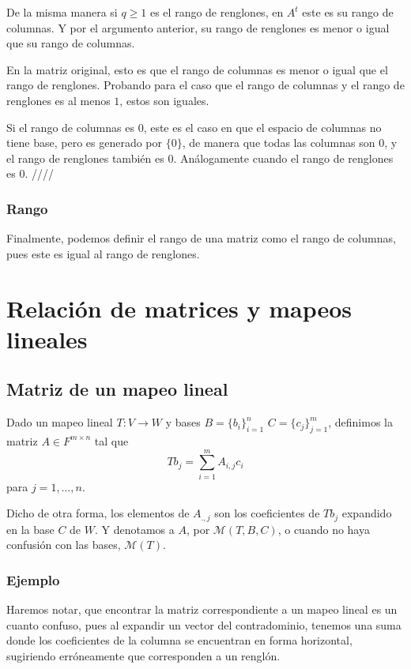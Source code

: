 \documentclass{article}
\begin{document}
De la misma manera si $q\geq 1$ es el rango de renglones, en $A^t$
este es su rango de columnas. Y por el argumento anterior, su
rango de renglones es menor o igual que su rango de columnas.

En la matriz original, esto es que el rango de columnas es menor
o igual que el rango de renglones. Probando para el caso que el rango 
de columnas y el rango de renglones es al menos $1$, estos son
iguales.

Si el rango de columnas es $0$, este es el caso en que el espacio de
columnas no tiene base, pero es generado por $\{0\}$, de manera que
todas las columnas son $0$, y el rango de renglones también es $0$. Análogamente cuando el rango de renglones es $0$.
\hfill ////

\subsubsection{Rango}
Finalmente, podemos definir el rango de una matriz como el rango de
columnas, pues este es igual al rango de renglones. 
\newpage

\section{Relación de matrices y mapeos lineales}
\subsection{Matriz de un mapeo lineal}
Dado un mapeo lineal $T: V\rightarrow W$ y bases $B=\{b_i\}^n_{i=1}$
$C=\{c_j\}^m_{j=1}$, definimos la matriz $A\in F^{m\times n}$ tal que
$$Tb_j = \sum^m_{i=1} A_{i,j} c_i$$
para $j=1,\ldots,n$.

\newcommand{\M}{\mathcal{M}}
Dicho de otra forma, los elementos de $A_{.,j}$ son los coeficientes
de $Tb_j$ expandido en la base $C$ de $W$. Y denotamos a $A$, por
$\mathcal{M}(T,B,C)$, o cuando no haya confusión con las bases,
$\mathcal{M}(T)$.

\subsubsection{Ejemplo}
Haremos notar, que encontrar la matriz correspondiente a un mapeo lineal
es un cuanto confuso, pues al expandir un vector del contradominio,
tenemos una suma donde los coeficientes de la columna se encuentran
en forma horizontal, sugiriendo erróneamente que corresponden a un
renglón.
\end{document}
